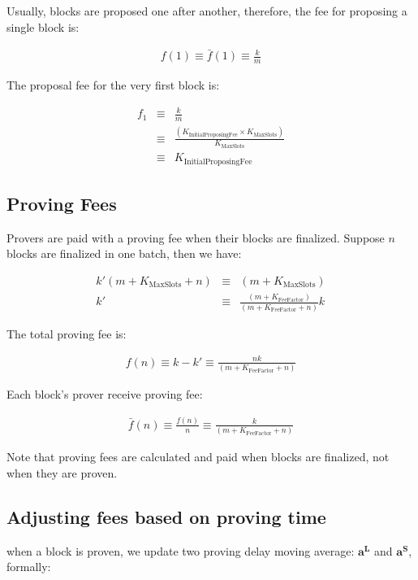 \documentclass[9pt,oneside]{amsart}
\begin{document}
\begin{multicols}{2}
Usually, blocks are proposed one after another, therefore, the fee for proposing a single block is:

\begin{eqnarray}
f(1)  \equiv \bar{f}(1)  \equiv \frac{k}{m}
\end{eqnarray}



The proposal fee for the very first block is:



\begin{eqnarray}
f_1  & \equiv & \frac{k}{m}  \\
\nonumber & \equiv & \frac{ (K_{\mathrm{InitialProposingFee}} \times K_{\mathrm{MaxSlots}})}{K_{\mathrm{MaxSlots}}}  \\
\nonumber & \equiv &K_{\mathrm{InitialProposingFee}}
\end{eqnarray}


\subsection{Proving Fees}

Provers are paid with a proving fee when their blocks are finalized. Suppose $n$ blocks are finalized in one batch, then we have:

\begin{eqnarray}
k'  (m+K_{\mathrm{MaxSlots}}+n) & \equiv  & (m+K_{\mathrm{MaxSlots}}) \\
\nonumber k'  & \equiv & \frac{(m+K_{\mathrm{FeeFactor}})}{(m+K_{\mathrm{FeeFactor}}+n)} k
\end{eqnarray}



The total proving fee is:

\begin{eqnarray}
f(n)  \equiv  k - k'  \equiv \frac{nk}{(m+K_{\mathrm{FeeFactor}}+n)}
\end{eqnarray}


Each block's prover receive proving fee:


\begin{eqnarray}
\bar{f}(n)  \equiv \frac{f(n)}{n}  \equiv \frac{k}{(m+K_{\mathrm{FeeFactor}}+n)}
\end{eqnarray}

Note that proving fees are calculated and paid when blocks are finalized, not when they are proven.

\subsection{Adjusting fees based on proving time}
when a block is proven, we update two proving delay moving average:  $\boldsymbol{a^L}$ and $\boldsymbol{a^S}$, formally:


\end{multicols}
\end{document}
